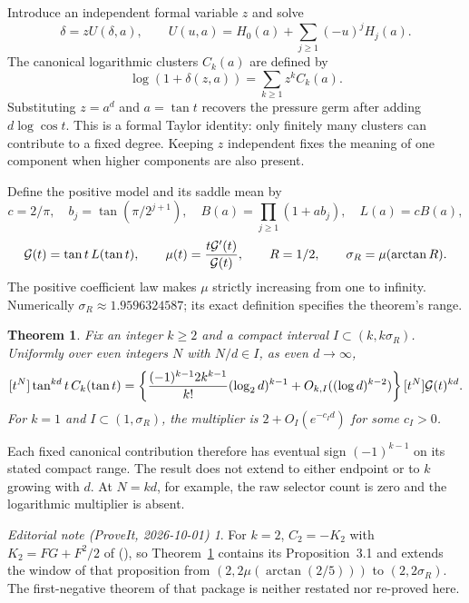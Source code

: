 \documentclass[11pt,a4paper]{article}
\newtheorem{theorem}{Theorem}[section]\newtheorem{lemma}[theorem]{Lemma}
\theoremstyle{remark}\newtheorem*{ednote}{Editorial note (ProveIt, 2026-10-01)}
\begin{document}
Introduce an independent formal variable $z$ and solve
\begin{equation}\label{eq:implicit}
 \delta=zU(\delta,a),\qquad
 U(u,a)=H_0(a)+\sum_{j\ge1}(-u)^jH_j(a).
\end{equation}
The canonical logarithmic clusters $C_k(a)$ are defined by
\[
 \log(1+\delta(z,a))=\sum_{k\ge1}z^kC_k(a).
\]
Substituting $z=a^d$ and $a=\tan t$ recovers the pressure germ after adding $d\log\cos t$. This is a formal Taylor identity: only finitely many clusters can contribute to a fixed degree. Keeping $z$ independent fixes the meaning of one component when higher components are also present.

Define the positive model and its saddle mean by
\[
 c=2/\pi,\quad b_j=\tan(\pi/2^{j+1}),\quad
 B(a)=\prod_{j\ge1}(1+ab_j),\quad L(a)=cB(a),
\]
\[
 \mathcal G(t)=\tan t\,L(\tan t),\qquad
 \mu(t)=\frac{t\mathcal G'(t)}{\mathcal G(t)},\qquad
 R=1/2,\qquad \sigma_R=\mu(\arctan R).
\]
The positive coefficient law makes $\mu$ strictly increasing from one to infinity. Numerically $\sigma_R\approx1.9596324587$; its exact definition specifies the theorem's range.

\begin{theorem}\label{thm:main}
Fix an integer $k\ge2$ and a compact interval $I\subset(k,k\sigma_R)$. Uniformly over even integers $N$ with $N/d\in I$, as even $d\to\infty$,
\begin{align}\label{eq:main}
 [t^N]\tan^{kd}t\,C_k(\tan t)
 =\left\{\frac{(-1)^{k-1}2k^{k-1}}{k!}(\log_2d)^{k-1}
 +O_{k,I}((\log d)^{k-2})\right\}[t^N]\mathcal G(t)^{kd}.
\end{align}
For $k=1$ and $I\subset(1,\sigma_R)$, the multiplier is $2+O_I(e^{-c_Id})$ for some $c_I>0$.
\end{theorem}
Each fixed canonical contribution therefore has eventual sign $(-1)^{k-1}$ on its stated compact range. The result does not extend to either endpoint or to $k$ growing with $d$. At $N=kd$, for example, the raw selector count is zero and the logarithmic multiplier is absent.
\begin{ednote}
For $k=2$, $C_2=-K_2$ with $K_2=FG+F^2/2$ of  (\cite{First}),
so Theorem~\ref{thm:main} contains its Proposition~3.1 and extends the window of that
proposition from $(2,2\mu(\arctan(2/5)))$ to $(2,2\sigma_R)$. The first-negative theorem of
that package is neither restated nor re-proved here.
\end{ednote}
\end{document}
